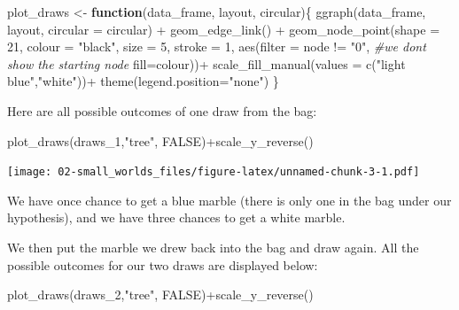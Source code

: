 \documentclass[
]{book}
\newenvironment{Shaded}{\begin{snugshade}}{\end{snugshade}}
\newcommand{\AttributeTok}[1]{\textcolor[rgb]{0.77,0.63,0.00}{#1}}
\newcommand{\CommentTok}[1]{\textcolor[rgb]{0.56,0.35,0.01}{\textit{#1}}}
\newcommand{\ConstantTok}[1]{\textcolor[rgb]{0.00,0.00,0.00}{#1}}
\newcommand{\ControlFlowTok}[1]{\textcolor[rgb]{0.13,0.29,0.53}{\textbf{#1}}}
\newcommand{\DecValTok}[1]{\textcolor[rgb]{0.00,0.00,0.81}{#1}}
\newcommand{\FunctionTok}[1]{\textcolor[rgb]{0.00,0.00,0.00}{#1}}
\newcommand{\NormalTok}[1]{#1}
\newcommand{\OtherTok}[1]{\textcolor[rgb]{0.56,0.35,0.01}{#1}}
\newcommand{\SpecialCharTok}[1]{\textcolor[rgb]{0.00,0.00,0.00}{#1}}
\newcommand{\StringTok}[1]{\textcolor[rgb]{0.31,0.60,0.02}{#1}}
\begin{document}
\begin{Shaded}
\begin{Highlighting}[]
\NormalTok{plot\_draws }\OtherTok{\textless{}{-}} \ControlFlowTok{function}\NormalTok{(data\_frame, layout, circular)\{}
  \FunctionTok{ggraph}\NormalTok{(data\_frame, layout, }\AttributeTok{circular =}\NormalTok{ circular) }\SpecialCharTok{+} 
    \FunctionTok{geom\_edge\_link}\NormalTok{() }\SpecialCharTok{+} 
    \FunctionTok{geom\_node\_point}\NormalTok{(}\AttributeTok{shape =} \DecValTok{21}\NormalTok{, }\AttributeTok{colour =} \StringTok{"black"}\NormalTok{, }\AttributeTok{size =} \DecValTok{5}\NormalTok{, }\AttributeTok{stroke =} \DecValTok{1}\NormalTok{,}
                    \FunctionTok{aes}\NormalTok{(}\AttributeTok{filter =}\NormalTok{ node }\SpecialCharTok{!=} \StringTok{"0"}\NormalTok{, }\CommentTok{\#we don\textquotesingle{}t show the starting node}
                        \AttributeTok{fill=}\NormalTok{colour))}\SpecialCharTok{+}
    \FunctionTok{scale\_fill\_manual}\NormalTok{(}\AttributeTok{values =} \FunctionTok{c}\NormalTok{(}\StringTok{"light blue"}\NormalTok{,}\StringTok{"white"}\NormalTok{))}\SpecialCharTok{+}
    \FunctionTok{theme}\NormalTok{(}\AttributeTok{legend.position=}\StringTok{"none"}\NormalTok{)}
\NormalTok{  \}}
\end{Highlighting}
\end{Shaded}

Here are all possible outcomes of one draw from the bag:

\begin{Shaded}
\begin{Highlighting}[]
\FunctionTok{plot\_draws}\NormalTok{(draws\_1,}\StringTok{"tree"}\NormalTok{, }\ConstantTok{FALSE}\NormalTok{)}\SpecialCharTok{+}\FunctionTok{scale\_y\_reverse}\NormalTok{()}
\end{Highlighting}
\end{Shaded}

\texttt{[image: 02-small\_worlds\_files/figure-latex/unnamed-chunk-3-1.pdf]}

We have once chance to get a blue marble (there is only one in the bag under our hypothesis), and we have three chances to get a white marble.

We then put the marble we drew back into the bag and draw again. All the possible outcomes for our two draws are displayed below:

\begin{Shaded}
\begin{Highlighting}[]
\FunctionTok{plot\_draws}\NormalTok{(draws\_2,}\StringTok{"tree"}\NormalTok{, }\ConstantTok{FALSE}\NormalTok{)}\SpecialCharTok{+}\FunctionTok{scale\_y\_reverse}\NormalTok{()}
\end{Highlighting}
\end{Shaded}
\end{document}
